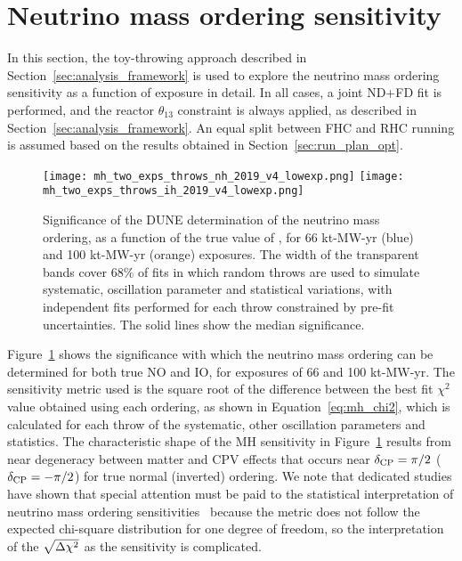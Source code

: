 \section{Neutrino mass ordering sensitivity}
\label{sec:mh_sens}

In this section, the toy-throwing approach described in Section~\ref{sec:analysis_framework} is used to explore the neutrino mass ordering sensitivity as a function of exposure in detail. In all cases, a joint ND+FD fit is performed, and the reactor $\theta_{13}$ constraint is always applied, as described in Section~\ref{sec:analysis_framework}. An equal split between FHC and RHC running is assumed based on the results obtained in Section~\ref{sec:run_plan_opt}.

\begin{figure}[htbp]
  \centering
  \texttt{[image: mh\_two\_exps\_throws\_nh\_2019\_v4\_lowexp.png]}
  \texttt{[image: mh\_two\_exps\_throws\_ih\_2019\_v4\_lowexp.png]}
  \caption{Significance of the DUNE determination of the neutrino mass ordering, as a function of the true value of \deltacp, for 66 kt-MW-yr (blue) and 100 kt-MW-yr (orange) exposures. The width of the transparent bands cover 68\% of fits in which random throws are used to simulate systematic, oscillation parameter and statistical variations, with independent fits performed for each throw constrained by pre-fit uncertainties. The solid lines show the median significance.}
  \label{fig:mh_bands}
\end{figure}
Figure~\ref{fig:mh_bands} shows the significance with which the neutrino mass ordering can be determined for both true NO and IO, for exposures of 66 and 100 kt-MW-yr. The sensitivity metric used is the square root of the difference between the best fit $\chi^{2}$ value obtained using each ordering, as shown in Equation~\ref{eq:mh_chi2}, which is calculated for each throw of the systematic, other oscillation parameters and statistics. The characteristic shape of the MH sensitivity in Figure~\ref{fig:mh_bands} results from near degeneracy between matter and CPV effects that occurs near $\delta_{\rm CP}=\pi/2$ ($\delta_{\rm CP}=-\pi/2$) for true normal (inverted) ordering. We note that dedicated studies have shown that special attention must be paid to the statistical interpretation of neutrino mass ordering sensitivities~\cite{Ciuffoli:2013rza,Qian:2012zn,Blennow:2013oma} because the \dchisq metric does not follow the expected chi-square distribution for one degree of freedom, so the interpretation of the $\sqrt{\Delta\chi^{2}}$ as the sensitivity is complicated.

